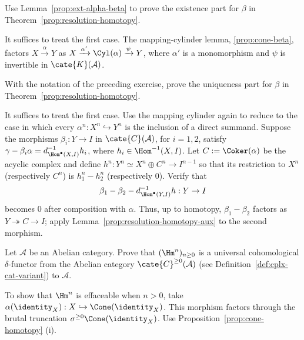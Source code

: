 \begin{Exercises}
	\item Use Lemma~\ref{prop:ext-alpha-beta} to prove the existence part for
	$\beta$ in Theorem~\ref{prop:resolution-homotopy}.

	\begin{hint}
		It suffices to treat the first case. The mapping-cylinder lemma,
		\ref{prop:cone-beta}, factors $X\xrightarrow{\alpha}Y$ as
		$X\xrightarrow{\alpha'}\Cyl(\alpha)\xrightarrow{\psi}Y$, where
		$\alpha'$ is a monomorphism and $\psi$ is invertible in
		$\cate{K}(\mathcal{A})$.
	\end{hint}

	\item With the notation of the preceding exercise, prove the uniqueness
	part for $\beta$ in Theorem~\ref{prop:resolution-homotopy}.

	\begin{hint}
		It suffices to treat the first case. Use the mapping cylinder again to
		reduce to the case in which every
		$\alpha^n:X^n\hookrightarrow Y^n$ is the inclusion of a direct
		summand. Suppose the morphisms $\beta_i:Y\to I$ in
		$\cate{C}(\mathcal{A})$, for $i=1,2$, satisfy
		$\gamma-\beta_i\alpha=d^{-1}_{\Hom^\bullet(X,I)}h_i$, where
		$h_i\in\Hom^{-1}(X,I)$. Let $C:=\Coker(\alpha)$ be the acyclic complex
		and define $h^n:Y^n\simeq X^n\oplus C^n\to I^{n-1}$ so that its
		restriction to $X^n$ (respectively $C^n$) is $h_1^n-h_2^n$
		(respectively $0$). Verify that
		\[
			\beta_1-\beta_2-d^{-1}_{\Hom^\bullet(Y,I)}h:Y\to I
		\]
		becomes $0$ after composition with $\alpha$. Thus, up to homotopy,
		$\beta_1-\beta_2$ factors as $Y\twoheadrightarrow C\to I$; apply
		Lemma~\ref{prop:resolution-homotopy-aux} to the second morphism.
	\end{hint}

	\item Let $\mathcal{A}$ be an Abelian category. Prove that
	$(\Hm^n)_{n\geq0}$ is a universal cohomological $\delta$-functor from the
	Abelian category $\cate{C}^{\geq0}(\mathcal{A})$ (see
	Definition~\ref{def:cplx-cat-variant}) to $\mathcal{A}$.
	\begin{hint}
		To show that $\Hm^n$ is effaceable when $n>0$, take
		$\alpha(\identity_X):X\hookrightarrow\Cone(\identity_X)$. This
		morphism factors through the brutal truncation
		$\sigma^{\geq0}\Cone(\identity_X)$. Use
		Proposition~\ref{prop:cone-homotopy} (i).
	\end{hint}


\end{Exercises}
